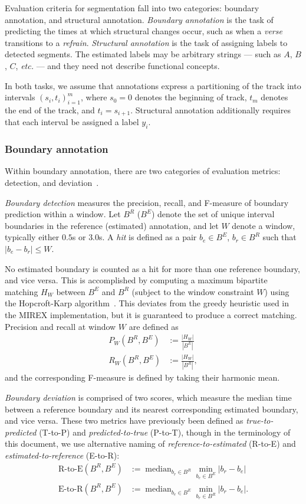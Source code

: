 \documentclass{article}
\def\etc{\emph{etc.\/}}
\DeclareMathOperator*{\median}{median}
\def\defeq{\ensuremath{:=}}
\begin{document}
Evaluation criteria for segmentation fall into two categories: boundary annotation, and structural annotation.
\emph{Boundary annotation} is the task of predicting the times at which structural changes occur, such as when a \emph{verse} transitions to a \emph{refrain}.
\emph{Structural annotation} is the task of assigning labels to detected segments.  
The estimated labels may be arbitrary strings --- such as $A$, $B$, $C$, \etc{} --- and they need not describe functional concepts.

In both tasks, we assume that annotations express a partitioning of the track 
into intervals ${(s_i, t_i)}_{i=1}^m$, where $s_0=0$ denotes the beginning of track, 
$t_m$ denotes the end of the track, and $t_i = s_{i+1}$.
Structural annotation additionally requires that each interval be assigned a label $y_i$.


\subsubsection{Boundary annotation}

Within boundary annotation, there are two categories of evaluation metrics: detection,
and deviation~\cite{turnbull2007supervised}.  

\emph{Boundary detection} measures the precision, recall, and F-measure of boundary prediction within a window.
Let $B^R$ ($B^E$) denote the set of unique interval boundaries in the reference (estimated) annotation, and let $W$ denote 
a window, typically either $0.5$s or $3.0$s.  
A \emph{hit} is defined as a pair $b_e \in B^E$, $b_r \in B^R$ such that $|b_e - b_r|
\leq W$.  

No estimated boundary is counted as a hit for more than one reference boundary, and vice versa.
This is accomplished by computing a maximum bipartite matching $H_W$ between $B^E$ and $B^R$ (subject to the window constraint $W$)
using the Hopcroft-Karp algorithm~\cite{hopcroft1973n}.  This deviates from the greedy heuristic used in the MIREX
implementation, but it is guaranteed to produce a correct matching.  Precision and recall at window $W$ are defined as
\begin{align}
P_W(B^R, B^E) &\defeq \frac{|H_W|}{|B^E|}\\
R_W(B^R, B^E) &\defeq \frac{|H_W|}{|B^R|},
\end{align}
and the corresponding F-measure is defined by taking their harmonic mean.

\emph{Boundary deviation} is comprised of two scores, which measure the median time between a reference boundary and its nearest corresponding estimated boundary, and vice versa.
These two metrics have previously been defined as \emph{true-to-predicted} (T-to-P) and \emph{predicted-to-true} (P-to-T), though in the terminology of this document, we use 
alternative naming of \emph{reference-to-estimated} (R-to-E) and \emph{estimated-to-reference} (E-to-R):
\begin{align}
\text{R-to-E}(B^R, B^E) &\defeq \displaystyle\median_{b_r \in B^R} \min_{b_e \in B^E} \left|b_r - b_e\right|\\
\text{E-to-R}(B^R, B^E) &\defeq \displaystyle\median_{b_e \in B^E} \min_{b_r \in B^R} \left|b_r - b_e\right|.
\end{align}
\end{document}
